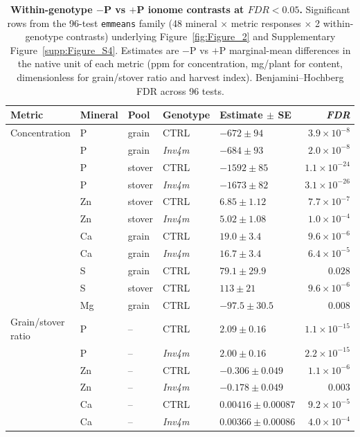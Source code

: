 \documentclass[9pt,twocolumn,twoside]{rilabRxiv}
\newcommand{\invfour}{\textit{Inv4m}\xspace}
\begin{document}
\begin{table}[!ht]
\centering
\small
\caption{\textbf{Within-genotype $-$P vs $+$P ionome contrasts at $\textit{FDR} < 0.05$.}
Significant rows from the 96-test \texttt{emmeans} family (48 mineral $\times$ metric responses $\times$ 2 within-genotype contrasts) underlying Figure~\ref{fig:Figure_2} and Supplementary Figure~\ref{supp:Figure_S4}.
Estimates are $-$P vs $+$P marginal-mean differences in the native unit of each metric (ppm for concentration, mg/plant for content, dimensionless for grain/stover ratio and harvest index).
Benjamini--Hochberg FDR across 96 tests.}
\label{table::ionome_contrasts}
\begin{tabular}{lllllr}
\hline
Metric & Mineral & Pool & Genotype & Estimate $\pm$ SE & \textit{FDR} \\
\hline
Concentration & P & grain & CTRL & $-672 \pm 94$ & $3.9\times 10^{-8}$ \\
 & P & grain & \invfour & $-684 \pm 93$ & $2.0\times 10^{-8}$ \\
 & P & stover & CTRL & $-1592 \pm 85$ & $1.1\times 10^{-24}$ \\
 & P & stover & \invfour & $-1673 \pm 82$ & $3.1\times 10^{-26}$ \\
 & Zn & stover & CTRL & $6.85 \pm 1.12$ & $7.7\times 10^{-7}$ \\
 & Zn & stover & \invfour & $5.02 \pm 1.08$ & $1.0\times 10^{-4}$ \\
 & Ca & grain & CTRL & $19.0 \pm 3.4$ & $9.6\times 10^{-6}$ \\
 & Ca & grain & \invfour & $16.7 \pm 3.4$ & $6.4\times 10^{-5}$ \\
 & S & grain & CTRL & $79.1 \pm 29.9$ & $0.028$ \\
 & S & stover & CTRL & $113 \pm 21$ & $9.6\times 10^{-6}$ \\
 & Mg & grain & CTRL & $-97.5 \pm 30.5$ & $0.008$ \\
\hline
Grain/stover ratio & P & -- & CTRL & $2.09 \pm 0.16$ & $1.1\times 10^{-15}$ \\
 & P & -- & \invfour & $2.00 \pm 0.16$ & $2.2\times 10^{-15}$ \\
 & Zn & -- & CTRL & $-0.306 \pm 0.049$ & $1.1\times 10^{-6}$ \\
 & Zn & -- & \invfour & $-0.178 \pm 0.049$ & $0.003$ \\
 & Ca & -- & CTRL & $0.00416 \pm 0.00087$ & $9.2\times 10^{-5}$ \\
 & Ca & -- & \invfour & $0.00366 \pm 0.00086$ & $4.0\times 10^{-4}$ \\

\end{tabular}
\end{table}
\end{document}
